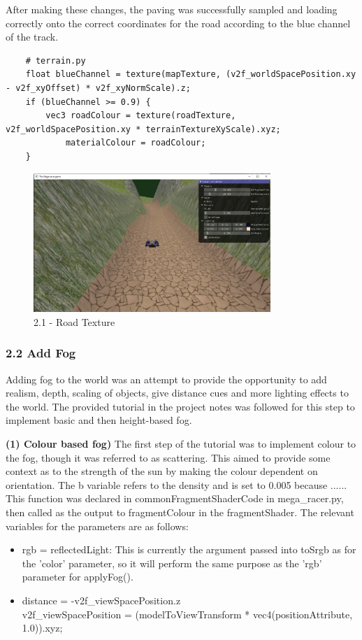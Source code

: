 \documentclass[a4 paper, 12pt]{article}
\begin{document}
After making these changes, the paving was successfully sampled and loading correctly onto the correct coordinates for the road according to the blue channel of the track.
    \begin{lstlisting}
    # terrain.py       
    float blueChannel = texture(mapTexture, (v2f_worldSpacePosition.xy - v2f_xyOffset) * v2f_xyNormScale).z;
    if (blueChannel >= 0.9) {
        vec3 roadColour = texture(roadTexture, v2f_worldSpacePosition.xy * terrainTextureXyScale).xyz;
            materialColour = roadColour;
    }
    \end{lstlisting} 

    \begin{figure} [H]
        \centering
        \includegraphics[width=0.8\textwidth, frame]
            {./images/mega_racer/2.1_c_final.PNG}
        \caption{2.1 - Road Texture}   
    \end{figure}


\subsubsection{2.2 Add Fog}
Adding fog to the world was an attempt to provide the opportunity to add realism, depth, scaling of objects, give distance cues and more lighting effects to the world. The provided tutorial in the project notes was followed for this step to implement basic and then height-based fog.

\textbf{(1) Colour based fog)}
The first step of the tutorial was to implement colour to the fog, though it was referred to as scattering. This aimed to provide some context as to the strength of the sun by making the colour dependent on orientation. The b variable refers to the density and is set to 0.005 because ...... This function was declared in commonFragmentShaderCode in mega\_racer.py, then called as the output to fragmentColour in the fragmentShader. The relevant variables for the parameters are as follows:
    \begin{itemize}
        \item rgb = reflectedLight: This is currently the argument passed into toSrgb as for the 'color' parameter, so it will perform the same purpose as the 'rgb' parameter for applyFog().
        \item distance = -v2f\_viewSpacePosition.z \\      
        v2f\_viewSpacePosition = (modelToViewTransform * vec4(positionAttribute, 1.0)).xyz;
    \end{itemize}
\end{document}
